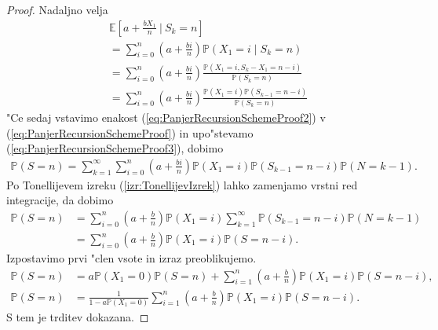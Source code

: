 \documentclass[12pt, a4paper, reqno]{amsart}
\theoremstyle{definition}
\theoremstyle{plain}
\newcommand{\E}{\mathbb{E}}
\newcommand{\Prob}{\mathbb{P}}
\newcommand{\1}{\mathds{1}}
\begin{document}
\begin{proof}
        Nadaljno velja  
        \begin{align}   
            & \E\left[a + \frac{bX_1}{n}\ \bigg| \  S_k = n\right] \nonumber \\
            &= \sum_{i = 0}^n\left(a + \frac{bi}{n}\right)\Prob\left(X_1 = i\mid S_k = n\right) \nonumber \\
            &= \sum_{i = 0}^n\left(a + \frac{bi}{n}\right)\frac{\Prob\left(X_1 = i, S_k - X_1 = n - i\right)}{\Prob\left(S_k = n\right)} \nonumber \\
            &= \sum_{i = 0}^n\left(a + \frac{bi}{n}\right)\frac{\Prob\left(X_1 = i\right)\Prob\left(S_{k- 1} = n - i\right)}{\Prob\left(S_k = n\right)} \label{eq:PanjerRecursionSchemeProof3} 
        \end{align}
        "Ce sedaj vstavimo enakost (\ref{eq:PanjerRecursionSchemeProof2}) v (\ref{eq:PanjerRecursionSchemeProof}) 
        in upo"stevamo (\ref{eq:PanjerRecursionSchemeProof3}), dobimo
        \begin{align*}
            \Prob\left(S = n\right) 
                = \sum_{k = 1}^\infty\sum_{i = 0}^n \left(a + \frac{bi}{n}\right)\Prob\left(X_1 = i\right)\Prob\left(S_{k - 1} = n - i\right)\Prob\left(N = k - 1\right).
        \end{align*}
        Po Tonellijevem izreku (\ref{izr:TonellijevIzrek}) lahko zamenjamo vrstni red integracije, da dobimo
        \begin{align*}
            \Prob\left(S = n\right) 
                &= \sum_{i = 0}^n\left(a + \frac{b}{n}\right)\Prob\left(X_1 = i\right)\sum_{k = 1}^\infty\Prob\left(S_{k - 1} = n - i\right)\Prob\left(N = k - 1\right)\\
                &= \sum_{i = 0}^n\left(a + \frac{b}{n}\right)\Prob\left(X_1 = i\right)\Prob\left(S = n - i\right).
        \end{align*}
        Izpostavimo prvi "clen vsote in izraz preoblikujemo.
        \begin{align*}
            \Prob\left(S = n\right) 
                &= a\Prob\left(X_1 = 0\right)\Prob\left(S = n\right) + \sum_{i = 1}^n\left(a + \frac{b}{n}\right)\Prob\left(X_1 = i\right)\Prob\left(S = n - i\right), \\
            \Prob\left(S = n\right)
                &= \frac{1}{1 - a\Prob\left(X_1 = 0\right)}\sum_{i = 1}^n\left(a + \frac{b}{n}\right)\Prob\left(X_1 = i\right)\Prob\left(S = n - i\right).
        \end{align*}
        S tem je trditev dokazana.
    \end{proof}
\end{document}
